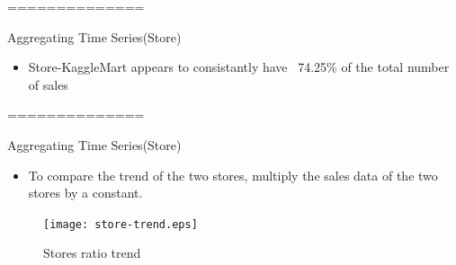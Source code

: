 \documentclass[
 size=14pt,
 paper=smartboard,  %
 mode=present, 		%
 display=slides, 	%
 style=tuliplab,  	%
 pauseslide,
 fleqn,leqno]{powerdot}
\begin{document}
==============
\begin{slide}[toc=,bm=]{Aggregating Time Series(Store)}
	
\begin{itemize}
	\bigskip
	\item
 	Store-KaggleMart appears to consistantly have ~74.25\% of the total number of sales
\end{itemize}
\bigskip
\begin{center}
\end{center}
\end{slide}

==============
\begin{slide}[toc=,bm=]{Aggregating Time Series(Store)}
	\begin{itemize}
		\item
		To compare the trend of the two stores, multiply the sales data of the two stores by a constant.
	\end{itemize}
			\begin{figure}
				\centering
				\texttt{[image: store-trend.eps]}
				\caption{Stores ratio trend}\label{fig:OutAspect-target}
			\end{figure}
\end{slide}
\end{document}
